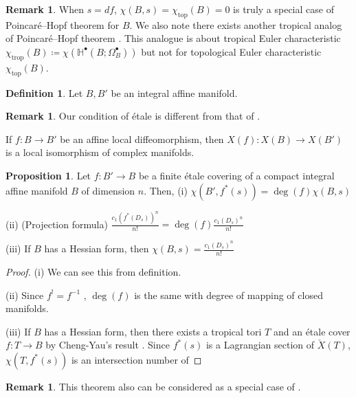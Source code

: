 \documentclass[a4paper,dvipdfmx,reqno,12pt]{amsart}
\theoremstyle{definition}
\newtheorem{Def}[Thm]{Definition}
\newtheorem{Prop}[Thm]{Proposition}
\newtheorem{Rmk}[Thm]{Remark}
\newcommand{\deq}{\coloneqq}
\newcommand{\mb}[1]{\mathbb{#1}}%
\newcommand{\opn}[1]{\operatorname{#1}}
\numberwithin{equation}{section}
\begin{document}
\begin{Rmk}
When $s=df$, $\chi(B,s)=\chi_{\opn{top}}(B)=0$ is 
truly a special case of Poincar\'e--Hopf theorem for $B$.
We also note there exists another tropical analog of Poincar\'e--Hopf theorem
  \cite{rau2020tropical}. This analogue is about tropical Euler characteristic
  $\chi_{\opn{trop}}(B)\deq \chi(\mb{H}^{\bullet}(B;\Omega_B^{\bullet}))$
  but not for topological Euler characteristic $\chi_{\opn{top}}(B)$.
\end{Rmk}

\begin{Def}
Let $B,B'$ be an integral affine manifold.
\end{Def}

\begin{Rmk}
Our condition of \'etale is different from that of 
\cite[Definition 1.1]{grossMirrorSymmetryLogarithmic2006a}.

If $f\colon B\to B'$ be an affine local diffeomorphism,
then $X(f)\colon X(B) \to X(B')$ is a local isomorphism of
complex manifolds.
\end{Rmk}

\begin{Prop}
Let $f\colon B'\to B$ be a finite \'etale covering of a compact integral affine 
manifold $B$ of dimension $n$. Then,
(i) $\chi(B',f^{*}(s))=\opn{deg}(f)\chi(B,s)$

(ii) (Projection formula) 
$\frac{c_1(f^{*}(D_s))^{n}}{n!}=\opn{deg}(f)\frac{c_1(D_s)^{n}}{n!}$

(iii) If $B$ has a Hessian form, then $\chi(B,s)=\frac{c_1(D_s)^{n}}{n!}$
\end{Prop}

\begin{proof}
(i) We can see this from definition.

(ii) Since $f^{!}=f^{-1}$ 
\cite[]{iversenCohomologySheaves1986a}
, $\opn{deg}(f)$ is the same with degree of 
mapping of closed manifolds.

(iii) If $B$ has a Hessian form, then there exists a tropical tori $T$
and an \'etale cover $f\colon T\to B$ by Cheng-Yau's result
\cite{MR714338}. Since $f^{*}(s)$ is a Lagrangian section
of $\check{X}(T)$, $\chi(T,f^{*}(s))$ is an intersection
number of
\end{proof}

\begin{Rmk} \label{rmk: integral_mirror}
This theorem also can be considered as a special case of \cite{MR4301560}.
\end{Rmk}
\end{document}
